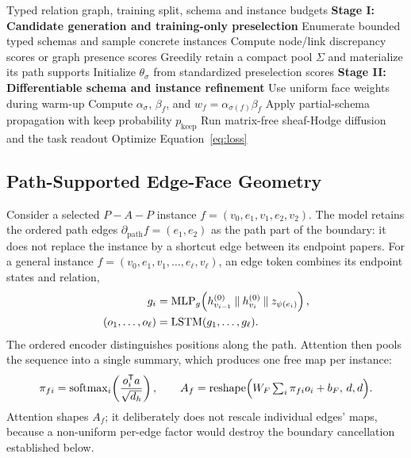 \begin{algorithm}[t]
  \caption{\ampss{} candidate preselection and differentiable refinement}
  \label{alg:ampss}
  \begin{algorithmic}[1]
    \REQUIRE Typed relation graph, training split, schema and instance budgets
    \STATE \textbf{Stage I: Candidate generation and training-only preselection}
    \STATE Enumerate bounded typed schemas and sample concrete instances
    \STATE Compute node/link discrepancy scores or graph presence scores
    \STATE Greedily retain a compact pool \(\Sigma\) and materialize its path supports
    \STATE Initialize \(\theta_\sigma\) from standardized preselection scores
      \STATE \textbf{Stage II: Differentiable schema and instance refinement}
      \STATE Use uniform face weights during warm-up
      \STATE Compute \(\alpha_\sigma\), \(\beta_f\), and \(w_f=\alpha_{\sigma(f)}\beta_f\)
      \STATE Apply partial-schema propagation with keep probability \(p_{\mathrm{keep}}\)
      \STATE Run matrix-free sheaf-Hodge diffusion and the task readout
      \STATE Optimize Equation~\ref{eq:loss}
    \ENDFOR
  \end{algorithmic}
\end{algorithm}

\subsection{Path-Supported Edge-Face Geometry}
\label{sec:face-geometry}

Consider a selected \(P\!-\!A\!-\!P\) instance
\(f=(v_0,e_1,v_1,e_2,v_2)\).  The model retains the ordered path edges
\(\partial_{\mathrm{path}}f=(e_1,e_2)\) as the path part of the boundary: it does not replace the instance by
a shortcut edge between its endpoint papers.  For a general instance
\(f=(v_0,e_1,v_1,\ldots,e_\ell,v_\ell)\), an edge token combines its endpoint states and relation,
\begin{equation}
  \begin{aligned}
  g_i&=\operatorname{MLP}_g\!\left(
    h_{v_{i-1}}^{(0)}\mathbin\Vert h_{v_i}^{(0)}\mathbin\Vert z_{\psi(e_i)}
  \right),\\
  (o_1,\ldots,o_\ell)&=\operatorname{LSTM}(g_1,\ldots,g_\ell).
  \end{aligned}
\end{equation}
The ordered encoder distinguishes positions along the path.  Attention then pools the sequence into
a single summary, which produces one free map per instance:
\begin{equation}
  \pi_{fi}
  =\operatorname{softmax}_{i}\!\left(
    \frac{o_i^{\mathsf{T}}a}{\sqrt{d_h}}
  \right),
  \qquad
  A_f
  =\operatorname{reshape}\!\Big(W_F\textstyle\sum_i\pi_{fi}o_i+b_F,\,d,d\Big).
  \label{eq:face-map}
\end{equation}
Attention shapes \(A_f\); it deliberately does not rescale individual edges' maps, because a
non-uniform per-edge factor would destroy the boundary cancellation established below.

